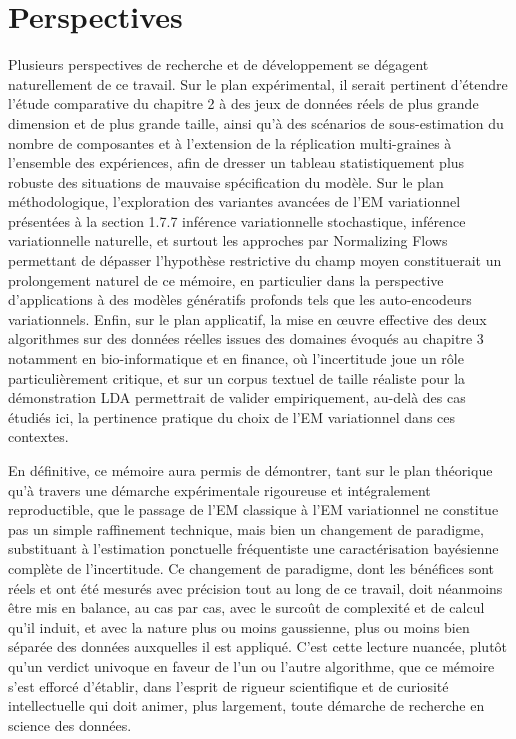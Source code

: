 \section*{Perspectives}
Plusieurs perspectives de recherche et de développement se dégagent naturellement de ce travail. Sur le plan expérimental, il serait pertinent d'étendre l'étude comparative du chapitre 2 à des jeux de données réels de plus grande dimension et de plus grande taille, ainsi qu'à des scénarios de sous-estimation du nombre de composantes et à l'extension de la réplication multi-graines à l'ensemble des expériences, afin de dresser un tableau statistiquement plus robuste des situations de mauvaise spécification du modèle. Sur le plan méthodologique, l'exploration des variantes avancées de l'EM variationnel présentées à la section 1.7.7  inférence variationnelle stochastique, inférence variationnelle naturelle, et surtout les approches par Normalizing Flows permettant de dépasser l'hypothèse restrictive du champ moyen  constituerait un prolongement naturel de ce mémoire, en particulier dans la perspective d'applications à des modèles génératifs profonds tels que les auto-encodeurs variationnels. Enfin, sur le plan applicatif, la mise en œuvre effective des deux algorithmes sur des données réelles issues des domaines évoqués au chapitre 3  notamment en bio-informatique et en finance, où l'incertitude joue un rôle particulièrement critique, et sur un corpus textuel de taille réaliste pour la démonstration LDA  permettrait de valider empiriquement, au-delà des cas étudiés ici, la pertinence pratique du choix de l'EM variationnel dans ces contextes.

En définitive, ce mémoire aura permis de démontrer, tant sur le plan théorique qu'à travers une démarche expérimentale rigoureuse et intégralement reproductible, que le passage de l'EM classique à l'EM variationnel ne constitue pas un simple raffinement technique, mais bien un changement de paradigme, substituant à l'estimation ponctuelle fréquentiste une caractérisation bayésienne complète de l'incertitude. Ce changement de paradigme, dont les bénéfices sont réels et ont été mesurés avec précision tout au long de ce travail, doit néanmoins être mis en balance, au cas par cas, avec le surcoût de complexité et de calcul qu'il induit, et avec la nature  plus ou moins gaussienne, plus ou moins bien séparée  des données auxquelles il est appliqué. C'est cette lecture nuancée, plutôt qu'un verdict univoque en faveur de l'un ou l'autre algorithme, que ce mémoire s'est efforcé d'établir, dans l'esprit de rigueur scientifique et de curiosité intellectuelle qui doit animer, plus largement, toute démarche de recherche en science des données.


